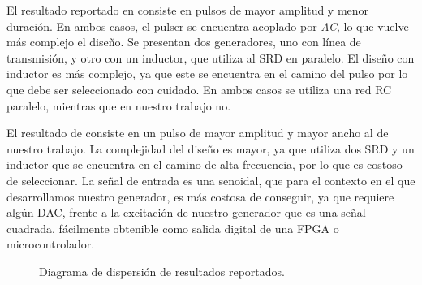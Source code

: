 El resultado reportado en \cite{han2005} consiste en pulsos de mayor amplitud y menor duración. En
ambos casos, el pulser se encuentra acoplado por \textit{AC}, lo que vuelve más complejo el diseño.
Se presentan dos generadores, uno con línea de transmisión, y otro con un inductor, que utiliza al
SRD en paralelo. El diseño con inductor es más complejo, ya que este se encuentra en el camino del
pulso por lo que debe ser seleccionado con cuidado. En ambos casos se utiliza una red RC paralelo,
mientras que en nuestro trabajo no.

El resultado de \cite{oloumi2018} consiste en un pulso de mayor amplitud y mayor ancho al de nuestro
trabajo. La complejidad del diseño es mayor, ya que utiliza dos SRD y un inductor que se encuentra
en el camino de alta frecuencia, por lo que es costoso de seleccionar. La señal de entrada es una
senoidal, que para el contexto en el que desarrollamos nuestro generador, es más costosa de
conseguir, ya que requiere algún DAC, frente a la excitación de nuestro generador que es una señal
cuadrada, fácilmente obtenible como salida digital de una FPGA o microcontrolador.

\begin{figure}
\centering
{}
  \caption{Diagrama de dispersión de resultados reportados.}
  \label{fig:scatterplot_literature}
\end{figure}
